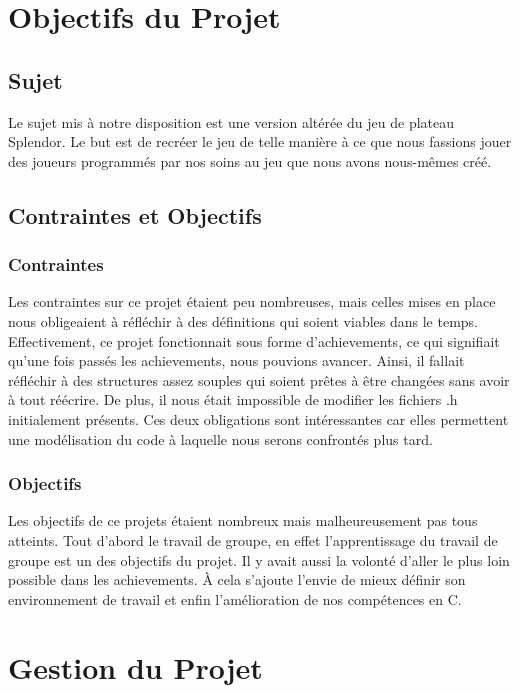 \documentclass{article}
\begin{document}
\section{Objectifs du Projet}
\subsection{Sujet}
\vspace{1em}Le sujet mis à notre disposition est une version altérée du jeu de plateau Splendor. Le but est de recréer le jeu de telle manière à ce que nous fassions jouer des joueurs programmés par nos soins au jeu que nous avons nous-mêmes créé.

\subsection{Contraintes et Objectifs}

\subsubsection{Contraintes}
\hspace{1em} Les contraintes sur ce projet étaient peu nombreuses, mais celles mises en place nous obligeaient à réfléchir à des définitions qui soient viables dans le temps. Effectivement, ce projet fonctionnait sous forme d'achievements, ce qui signifiait qu'une fois passés les achievements, nous pouvions avancer. Ainsi, il fallait réfléchir à des structures assez souples qui soient prêtes à être changées sans avoir à tout réécrire. De plus, il nous était impossible de modifier les fichiers .h initialement présents. Ces deux obligations sont intéressantes car elles permettent une modélisation du code à laquelle nous serons confrontés plus tard.

\subsubsection{Objectifs}
\hspace{1em} Les objectifs de ce projets étaient nombreux mais malheureusement pas tous atteints. Tout d'abord le travail de groupe, en effet l'apprentissage du travail de groupe est un des objectifs du projet. Il y avait aussi la volonté d'aller le plus loin possible dans les achievements. À cela s'ajoute l'envie de mieux définir son environnement de travail et enfin l'amélioration de nos compétences en C. 

\section{Gestion du Projet}
 
\end{document}
